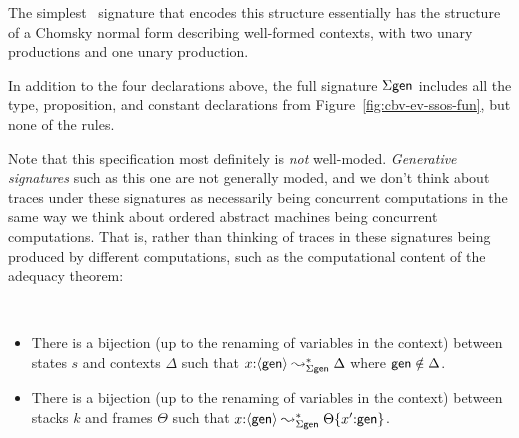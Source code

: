 The simplest \sls~signature that encodes this structure essentially
has the structure of a Chomsky normal form describing well-formed
contexts, with two unary productions and one unary production.

\smallskip
{}
\smallskip

\noindent In addition to the four declarations above, the full
signature $\Sigma\sf gen$ includes all the type, proposition, and
constant declarations from Figure~\ref{fig:cbv-ev-ssos-fun}, but none
of the rules.

Note that this specification most definitely is {\it not} well-moded.
{\it Generative signatures} such as this one are not generally moded,
and we don't think about traces under these signatures as 
necessarily being concurrent computations in the same way we think
about ordered abstract machines being concurrent computations. That is,
rather than thinking of traces in these signatures being produced by
different computations, such as the computational content of the adequacy
theorem:

\bigskip
\begin{theorem}~
\label{thm:adequacy-states}
\begin{itemize}
\item There is a bijection (up to the renaming of variables in the context) 
  between states $s$ and contexts $\Delta$ such that
  $x{:}\langle {\sf gen} \rangle \leadsto^*_{\Sigma\sf gen} \Delta$ where 
  ${\sf gen} \notin \Delta$.
\item There is a bijection (up to the renaming of variables in the context) 
  between stacks $k$ and frames $\Theta$ such that $x{:}\langle {\sf
    gen} \rangle \leadsto^*_{\Sigma\sf gen} {\Theta}\{{x'{:}{\sf gen}}\}$.
\end{itemize}
\end{theorem}

